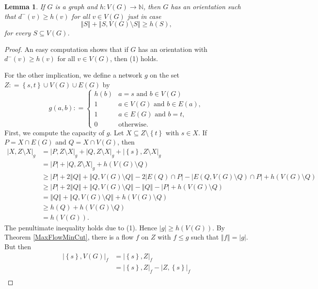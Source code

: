 \documentclass[openany]{tufte-book} %
\theoremstyle{plain}
\newtheorem{lemma}{Lemma}
\newcommand{\set}[1]{\left\{ #1 \right\}}
\newcommand{\card}[1]{\left|#1\right|}
\newcommand{\size}[1]{\left\Vert#1\right\Vert}
\newcommand{\func}[3]{#1\colon #2 \rightarrow #3}
\newcommand{\parens}[1]{\left( #1 \right)}
\newcommand{\DefinedAs}{\mathrel{\mathop:}=}
\newcommand{\IN}{\mathbb{N}}
\begin{document}
\begin{lemma}\label{InOrientations} If $G$ is a graph and $\func{h}{V(G)}{\IN}$,
then $G$ has an orientation such that $d^{-}(v)\ge h(v)$ for all $v\in V(G)$ just in case
\begin{equation}
\size{S}+\size{S,V(G)\setminus S}\ge h(S),
\end{equation}
for every $S \subseteq V(G)$.
\end{lemma}
\begin{proof}
An easy computation shows that if $G$ has an orientation with $d^{-}(v)\ge h(v)$ for all $v\in V(G)$, then (1) holds.

For the other implication, we define a network $g$ on the set $Z \DefinedAs \set{s,t} \cup V(G) \cup E(G)$ by
\[g(a, b) \DefinedAs  \begin{cases} 
      h(b) & a = s \text{ and } b \in  V(G)\\
	  1 & a \in V(G) \text{ and } b \in E(a),\\
      1 & a \in E(G) \text{ and } b = t,\\
      0 & \text{otherwise} .
   \end{cases}
\]
First, we compute the capacity of $g$. Let $X \subseteq Z \setminus \set{t}$ with $s \in X$.  If $P = X \cap E(G)$ and $Q = X \cap V(G)$, then
\begin{align*}
\card{X, Z\setminus X}_g &= \card{P, Z\setminus X}_g + \card{Q, Z\setminus X}_g + \card{\set{s}, Z\setminus X}_g\\
&=\card{P} + \card{Q, Z\setminus X}_g + h\parens{V(G)\setminus Q}\\
&\ge\card{P} + 2\size{Q} + \size{Q, V(G)\setminus Q} - 2\card{E(Q) \cap P} - \card{E(Q, V(G)\setminus Q) \cap P} + h\parens{V(G)\setminus Q}\\
&\ge\card{P} + 2\size{Q} + \size{Q, V(G)\setminus Q} -\size{Q} - \card{P} + h\parens{V(G)\setminus Q}\\
&= \size{Q} + \size{Q, V(G)\setminus Q} + h\parens{V(G)\setminus Q}\\
&\ge h(Q) + h\parens{V(G)\setminus Q}\\
&= h(V(G)).
\end{align*}
The penultimate inequality holds due to (1).
Hence $\card{g} \ge h(V(G))$.  By Theorem \ref{MaxFlowMinCut}, there is a flow $f$ on $Z$ with $f \le g$ such that $\size{f} = \card{g}$.  But then
\begin{align*}
\card{\set{s}, V(G)}_f &=  \card{\set{s}, Z}_f \\
&= \card{\set{s}, Z}_f - \card{Z, \set{s}}_f\\

\end{align*}
\end{proof}
\end{document}
